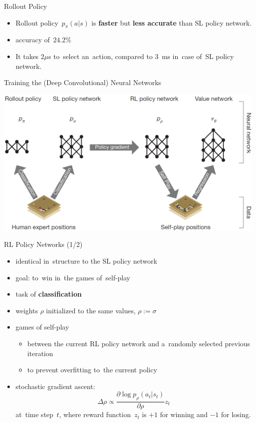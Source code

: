 \documentclass{beamer}
\begin{document}
{    \begin{frame}{Rollout Policy}
      \begin{itemize}[<+- | alert@+>]
        \item Rollout policy~$p_\pi(a|s)$ is \textbf{faster} but \textbf{less accurate} than SL policy network.
        \item accuracy of~$24.2\%$
        \item It takes $2 \mu$s to~select an~action, compared to $3$~ms in~case of~SL policy network.
      \end{itemize}
    \end{frame}

    \begin{frame}{Training the (Deep Convolutional) Neural Networks}
      \begin{center}
        \includegraphics[width=\textwidth]{../img/neural_nets_pipeline.png}
      \end{center}
    \end{frame}

    \begin{frame}{RL Policy Networks (1/2)}
      \begin{itemize}[<+- | alert@+>]
        \item identical in~structure to the SL policy network
        \item goal: to~win in~the games of~self-play
        \item task of \textbf{classification}
        \item weights $\rho$ initialized to the same values, $\rho := \sigma$
        \item games of self-play
          \begin{itemize}[<+- | alert@+>]
            \item between the current RL policy network and a~randomly selected previous iteration
            \item to prevent overfitting to~the current policy
          \end{itemize}
        \item stochastic gradient ascent:
          \[
            \Delta \rho \propto \frac{\partial \log p_\rho (a_t|s_t)}{\partial \rho} z_t
          \]
          {\tiny at~time step~$t$, where reward function~$z_t$ is $+1$ for winning and $-1$ for losing.}
      \end{itemize}
      \pause
    \end{frame}

}
\end{document}
